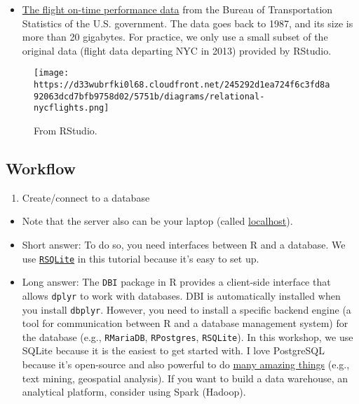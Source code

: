 \documentclass[
]{book}
\providecommand{\tightlist}{%
  \setlength{\itemsep}{0pt}\setlength{\parskip}{0pt}}
\begin{document}
\begin{itemize}
\tightlist
\item
  \href{https://www.transtats.bts.gov/DL_SelectFields.asp?Table_ID=236}{The flight on-time performance data} from the Bureau of Transportation Statistics of the U.S. government. The data goes back to 1987, and its size is more than 20 gigabytes. For practice, we only use a small subset of the original data (flight data departing NYC in 2013) provided by RStudio.
\end{itemize}

\begin{figure}
\centering
\texttt{[image: https://d33wubrfki0l68.cloudfront.net/245292d1ea724f6c3fd8a92063dcd7bfb9758d02/5751b/diagrams/relational-nycflights.png]}
\caption{From RStudio.}
\end{figure}

\hypertarget{workflow-4}{%
\subsection{Workflow}\label{workflow-4}}

\begin{enumerate}
\def\labelenumi{\arabic{enumi}.}
\tightlist
\item
  Create/connect to a database
\end{enumerate}

\begin{itemize}
\item
  Note that the server also can be your laptop (called \href{https://en.wikipedia.org/wiki/Localhost\#:~:text=In\%20computer\%20networking\%2C\%20localhost\%20is,via\%20the\%20loopback\%20network\%20interface.}{localhost}).
\item
  Short answer: To do so, you need interfaces between R and a database. We use \href{https://github.com/r-dbi/RSQLite}{\texttt{RSQLite}} in this tutorial because it's easy to set up.
\item
  Long answer: The \texttt{DBI} package in R provides a client-side interface that allows \texttt{dplyr} to work with databases. DBI is automatically installed when you install \texttt{dbplyr}. However, you need to install a specific backend engine (a tool for communication between R and a database management system) for the database (e.g., \texttt{RMariaDB}, \texttt{RPostgres}, \texttt{RSQLite}). In this workshop, we use SQLite because it is the easiest to get started with. I love PostgreSQL because it's open-source and also powerful to do \href{https://www.postgresql.org/docs/current/functions.html}{many amazing things} (e.g., text mining, geospatial analysis). If you want to build a data warehouse, an analytical platform, consider using Spark (Hadoop).
\end{itemize}
\end{document}
